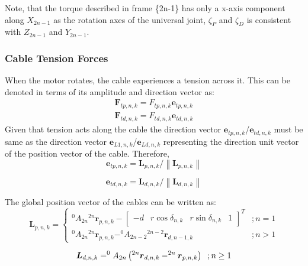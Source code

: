\documentclass[a4paper,12pt]{report}
\begin{document}
Note, that the torque described in frame \{2n-1\} has only a x-axis component along $X_{2n-1}$ as the rotation axes of the universal joint, $\zeta_P$ and $\zeta_D$ is consistent with $Z_{2n-1}$ and $Y_{2n-1}$.
\subsubsection{Cable Tension Forces}
When the motor rotates, the cable experiences a tension across it. This can be denoted in terms of its amplitude and direction vector as:
\begin{equation}
\begin{array}{l}
\boldsymbol{F}_{t p, n, k}=F_{t p, n, k} \boldsymbol{e}_{t p, n, k} \\
\boldsymbol{F}_{t d, n, k}=F_{t d, n, k} \boldsymbol{e}_{t d, n, k}
\end{array}
\end{equation}
Given that tension acts along the cable the direction vector $\boldsymbol{e}_{t p, n, k}$/$\boldsymbol{e}_{t d, n, k}$ must be same as the direction vector  $\boldsymbol{e}_{L 1, n, k}$/$\boldsymbol{e}_{L d, n, k}$ representing the direction unit vector of the position vector of the cable. Therefore, 
\begin{equation}
\boldsymbol{e}_{t p, n, k}=\boldsymbol{L}_{p, n, k} /\left\|\boldsymbol{L}_{p, n, k}\right\|
\end{equation}

\begin{equation}
\boldsymbol{e}_{t d, n, k}=\boldsymbol{L}_{d, n, k} /\left\|\boldsymbol{L}_{d, n, k}\right\|
\end{equation}

The global position vector of the cables can be written as:
\begin{equation}
\boldsymbol{L}_{p, n, k}=\left\{\begin{array}{ll}
^{0} A_{2 n}{}^{2 n} \boldsymbol{r}_{p, n, k}-\left[\begin{array}{cccc}
-d & r \cos{\delta_{n,k\textbf{}}} & r \sin{\delta_{n,k}} & 1
\end{array}\right]^{T} & ; n=1 \\
^{0} A_{2 n}{}^{2 n} \boldsymbol{r}_{p, n, k}-^{0} A_{2 n-2}{}^{2 n-2} \boldsymbol{r}_{d, n-1, k} & ; n>1
\end{array}\right.
\end{equation}

\begin{equation}
\boldsymbol{L}_{d, n, k}=^{0} A_{2 n}\left(^{2 n} \boldsymbol{r}_{d, n, k}-^{2 n} \boldsymbol{r}_{p, n, k}\right) \hspace{2mm}; n \geq 1
\end{equation}
\end{document}
